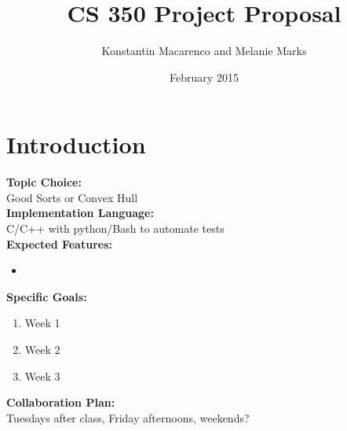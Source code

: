\documentclass{article}
\title{CS 350 Project Proposal}
\author{Konstantin Macarenco and Melanie Marks }
\date{February 2015}
\begin{document}
\maketitle


%



\section{Introduction}
\textbf{Topic Choice:}\\
Good Sorts or Convex Hull\\
\textbf{Implementation Language:}\\
C/C++ with python/Bash to automate tests\\
\textbf{Expected Features:} 
\begin{itemize}
\item 
\end{itemize}
\textbf{Specific Goals:} \\
\begin{enumerate}
\item Week 1 \\
\item Week 2 \\
\item Week 3 \\
\end{enumerate}
\textbf{Collaboration Plan: }\\
Tuesdays after class, Friday afternoons, weekends?
\end{document}
